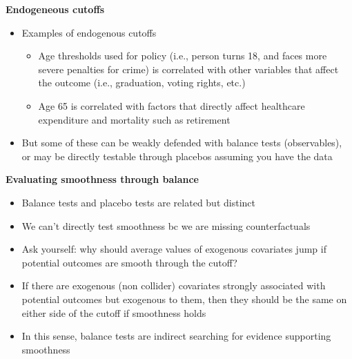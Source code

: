 \documentclass[notes=show]{beamer}
\begin{document}
\begin{frame}[plain]
\begin{center}
\textbf{Endogeneous cutoffs}
\end{center}

\begin{itemize}
\item Examples of endogenous cutoffs
	\begin{itemize}
	\item Age thresholds used for policy (i.e., person turns 18, and faces more severe penalties for crime) is correlated with other variables that affect the outcome (i.e., graduation, voting rights, etc.)
	\item Age 65 is correlated with factors that directly affect healthcare expenditure and mortality such as retirement
	\end{itemize}
\item But some of these can be weakly defended with balance tests (observables), or may be directly testable through placebos assuming you have the data
\end{itemize}

\end{frame}
	
	
\begin{frame}[plain]
	\begin{center}
	\textbf{Evaluating smoothness through balance}
	\end{center}
	
	\begin{itemize}
	\item Balance tests and placebo tests are related but distinct
	\item We can't directly test smoothness bc we are missing counterfactuals
	\item Ask yourself: why should average values of exogenous covariates jump if potential outcomes are smooth through the cutoff?
	\item If there are exogenous (non collider) covariates strongly associated with potential outcomes but exogenous to them, then they should be the same on either side of the cutoff if smoothness holds
	\item In this sense, balance tests are indirect searching for evidence supporting smoothness
	\end{itemize}
\end{frame}
\end{document}
